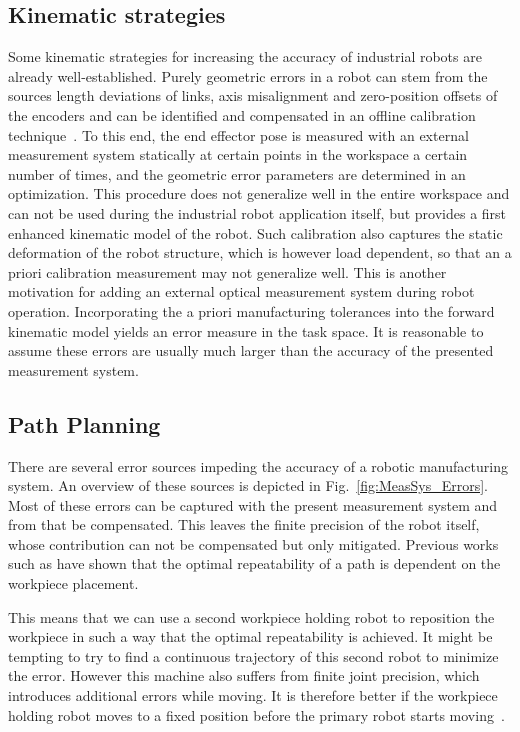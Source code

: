 \documentclass[5p,times,procedia]{elsarticle}
\begin{document}
\subsection{Kinematic strategies}
Some kinematic strategies for increasing the accuracy of industrial robots are already well-established.
Purely geometric errors in a robot can stem from the sources length deviations of links, axis misalignment and zero-position offsets of the encoders and can be identified and compensated in an offline calibration technique~\cite{Wiest01}.
To this end, the end effector pose is measured with an external measurement system statically at certain points in the workspace a certain number of times, and the geometric error parameters are determined in an optimization.
This procedure does not generalize well in the entire workspace and can not be used during the industrial robot application itself, but provides a first enhanced kinematic model of the robot.
Such calibration also captures the static deformation of the robot structure, which is however load dependent, so that an a priori calibration measurement may not generalize well. This is another motivation for adding an external optical measurement system during robot operation.
Incorporating the a priori manufacturing tolerances into the forward kinematic model yields an error measure in the task space.
It is reasonable to assume these errors are usually much larger than the accuracy of the presented measurement system.
%
\subsection{Path Planning}\label{subsec:PathPlanning}
There are several error sources impeding the accuracy of a robotic manufacturing system.
An overview of these sources is depicted in Fig.~\ref{fig:MeasSys_Errors}.
Most of these errors can be captured with the present measurement system and from that be compensated.
This leaves the finite precision of the robot itself, whose contribution can not be compensated but only mitigated.
Previous works such as \cite{previous_work} have shown that the optimal repeatability of a path is dependent on the workpiece placement.

This means that we can use a second workpiece holding robot to reposition the workpiece in such a way that the optimal repeatability is achieved.
It might be tempting to try to find a continuous trajectory of this second robot to minimize the error.
However this machine also suffers from finite joint precision, which introduces additional errors while moving.
It is therefore better if the workpiece holding robot moves to a fixed position before the primary robot starts moving~\cite{stroke_division}. 
\end{document}
